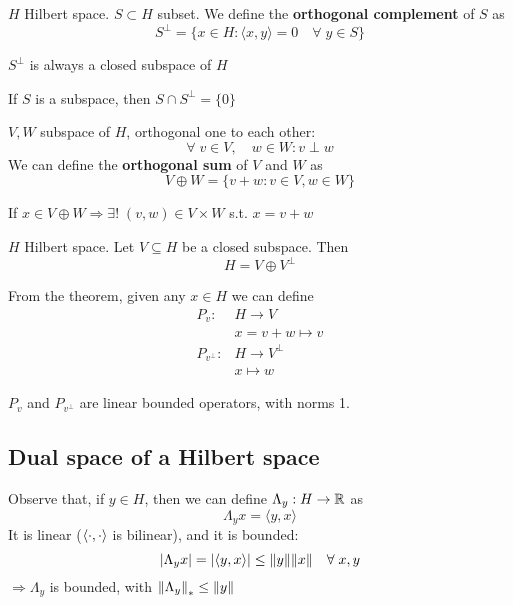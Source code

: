 \begin{definition}
    \(H\) Hilbert space. \(S \subset H\) subset. We define the \textbf{orthogonal complement} of \(S\) as 
    \[
        S^\perp = \{ x \in H:  \langle x, y\rangle = 0 \quad \forall\; y \in S\}
    \]
\end{definition}
\begin{example}
    \(S^\perp \) is always a closed subspace of \(H\)
\end{example}
\begin{example}
    If \(S\) is a subspace, then \(S \cap S^\perp = \{0\}\)
\end{example}

\begin{definition}
    \(V, W\) subspace of \(H\), orthogonal one to each other:
    \[
        \forall \; v \in V, \quad w \in W: v \perp w
    \]
    We can define the \textbf{orthogonal sum} of \(V\) and \(W\) as 
    \[
        V \oplus W = \{ v+w : v \in V, w \in W \}
    \]
\end{definition}
\begin{example}
    If \(x \in V \oplus W \Rightarrow \exists! \; (v, w) \in V \times W\) s.t. \(x=v+w\)
\end{example}

\begin{theorem}
    \(H\) Hilbert space. Let \(V \subseteq H\) be a closed subspace. Then 
    \[
        H = V \oplus V^\perp
    \]
\end{theorem}

\begin{definition}
    From the theorem, given any \(x \in H\) we can define
    \[
        \begin{array}{rl}
            P_v: & H \to V \\
            & x = v + w \mapsto v \\ \tag*{orthogonal projections}
            P_{v^\perp} : & H \to V^\perp \\
            & x \mapsto w
        \end{array}
    \]
\end{definition}
\begin{example}
    \(P_v \) and \(P_{v^\perp}\) are linear bounded operators, with norms 1.
\end{example}
\subsection{Dual space of a Hilbert space}
Observe that, if \(y \in H\), then we can define \(\Lambda_y : H \to \mathbb{R}\) as
\[
    \Lambda_y x = \langle y, x\rangle  
\]
It is linear (\(\langle \cdot,\cdot \rangle   \) is bilinear), and it is bounded: 
\[
    \abs{\Lambda_y x}= \abs{\langle y, x\rangle  } \leq \norm{y} \norm{x} \quad \forall\; x, y
\]
\(\Rightarrow \Lambda_y\) is bounded, with \(\norm{\Lambda_y}_* \leq \norm{y}\)

